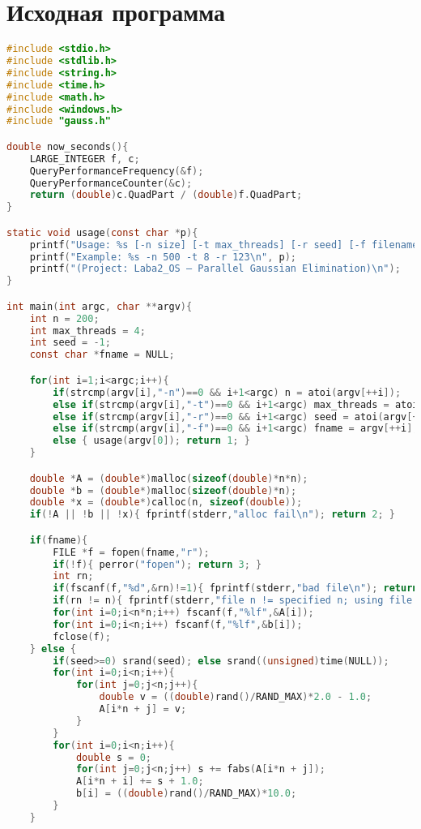 \section{Исходная программа}

\begin{lstlisting}[language=C]
#include <stdio.h>
#include <stdlib.h>
#include <string.h>
#include <time.h>
#include <math.h>
#include <windows.h>
#include "gauss.h"

double now_seconds(){
    LARGE_INTEGER f, c;
    QueryPerformanceFrequency(&f);
    QueryPerformanceCounter(&c);
    return (double)c.QuadPart / (double)f.QuadPart;
}

static void usage(const char *p){
    printf("Usage: %s [-n size] [-t max_threads] [-r seed] [-f filename]\n", p);
    printf("Example: %s -n 500 -t 8 -r 123\n", p);
    printf("(Project: Laba2_OS — Parallel Gaussian Elimination)\n");
}

int main(int argc, char **argv){
    int n = 200;
    int max_threads = 4;
    int seed = -1;
    const char *fname = NULL;

    for(int i=1;i<argc;i++){
        if(strcmp(argv[i],"-n")==0 && i+1<argc) n = atoi(argv[++i]);
        else if(strcmp(argv[i],"-t")==0 && i+1<argc) max_threads = atoi(argv[++i]);
        else if(strcmp(argv[i],"-r")==0 && i+1<argc) seed = atoi(argv[++i]);
        else if(strcmp(argv[i],"-f")==0 && i+1<argc) fname = argv[++i];
        else { usage(argv[0]); return 1; }
    }

    double *A = (double*)malloc(sizeof(double)*n*n);
    double *b = (double*)malloc(sizeof(double)*n);
    double *x = (double*)calloc(n, sizeof(double));
    if(!A || !b || !x){ fprintf(stderr,"alloc fail\n"); return 2; }

    if(fname){
        FILE *f = fopen(fname,"r");
        if(!f){ perror("fopen"); return 3; }
        int rn;
        if(fscanf(f,"%d",&rn)!=1){ fprintf(stderr,"bad file\n"); return 4; }
        if(rn != n){ fprintf(stderr,"file n != specified n; using file n\n"); n = rn; }
        for(int i=0;i<n*n;i++) fscanf(f,"%lf",&A[i]);
        for(int i=0;i<n;i++) fscanf(f,"%lf",&b[i]);
        fclose(f);
    } else {
        if(seed>=0) srand(seed); else srand((unsigned)time(NULL));
        for(int i=0;i<n;i++){
            for(int j=0;j<n;j++){
                double v = ((double)rand()/RAND_MAX)*2.0 - 1.0;
                A[i*n + j] = v;
            }
        }
        for(int i=0;i<n;i++){
            double s = 0;
            for(int j=0;j<n;j++) s += fabs(A[i*n + j]);
            A[i*n + i] += s + 1.0;
            b[i] = ((double)rand()/RAND_MAX)*10.0;
        }
    }


\end{lstlisting}
